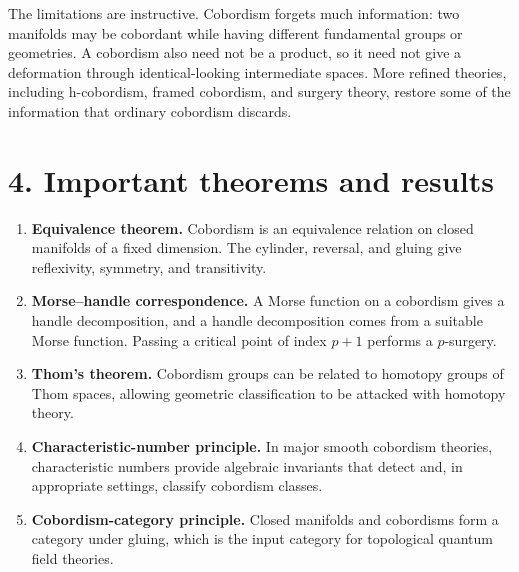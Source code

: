 The limitations are instructive. Cobordism forgets much information: two manifolds may be cobordant while having different fundamental groups or geometries. A cobordism also need not be a product, so it need not give a deformation through identical-looking intermediate spaces. More refined theories, including h-cobordism, framed cobordism, and surgery theory, restore some of the information that ordinary cobordism discards.

\section*{4. Important theorems and results}
\begin{enumerate}[leftmargin=*,itemsep=0.35em]

\item \textbf{Equivalence theorem.} Cobordism is an equivalence relation on closed manifolds of a fixed dimension. The cylinder, reversal, and gluing give reflexivity, symmetry, and transitivity. \cite{cobordism_theory_ref1}

\item \textbf{Morse--handle correspondence.} A Morse function on a cobordism gives a handle decomposition, and a handle decomposition comes from a suitable Morse function. Passing a critical point of index $p+1$ performs a $p$-surgery. \cite{cobordism_theory_ref7}

\item \textbf{Thom's theorem.} Cobordism groups can be related to homotopy groups of Thom spaces, allowing geometric classification to be attacked with homotopy theory. \cite{cobordism_theory_ref4}

\item \textbf{Characteristic-number principle.} In major smooth cobordism theories, characteristic numbers provide algebraic invariants that detect and, in appropriate settings, classify cobordism classes. \cite{cobordism_theory_ref3}

\item \textbf{Cobordism-category principle.} Closed manifolds and cobordisms form a category under gluing, which is the input category for topological quantum field theories. \cite{cobordism_theory_ref8}
\end{enumerate}

\theoryapplications
{}
